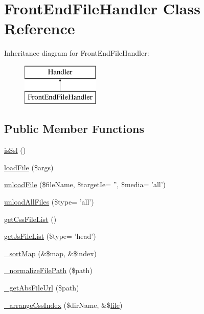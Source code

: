 \hypertarget{classFrontEndFileHandler}{\section{Front\+End\+File\+Handler Class Reference}
\label{classFrontEndFileHandler}
}
Inheritance diagram for Front\+End\+File\+Handler\+:\begin{figure}[H]
\begin{center}
\leavevmode
\includegraphics[height=2.000000cm]{classFrontEndFileHandler}
\end{center}
\end{figure}
\subsection*{Public Member Functions}
\begin{DoxyCompactItemize}
\item 
\hyperlink{classFrontEndFileHandler_a2bd70c621572f784c4e563d0dafa0fc2}{is\+Ssl} ()
\item 
\hyperlink{classFrontEndFileHandler_aeb802ae7b7b315da73ec3be224ce9e9f}{load\+File} (\$args)
\item 
\hyperlink{classFrontEndFileHandler_ad55bc752b0d140bbfefaaa30057db3d2}{unload\+File} (\$file\+Name, \$target\+Ie= '', \$media= 'all')
\item 
\hyperlink{classFrontEndFileHandler_ad118128391da5bb33e4a7105152432bc}{unload\+All\+Files} (\$type= 'all')
\item 
\hyperlink{classFrontEndFileHandler_a35cff5fb32625790d01e8839c73fd0fc}{get\+Css\+File\+List} ()
\item 
\hyperlink{classFrontEndFileHandler_ab6147b1dac393bc3838d433f3c46553f}{get\+Js\+File\+List} (\$type= 'head')
\item 
\hyperlink{classFrontEndFileHandler_a3677abdd2a1a3a17fd1de9f58ffe27a5}{\+\_\+sort\+Map} (\&\$map, \&\$index)
\item 
\hyperlink{classFrontEndFileHandler_a4818293d9395dd1b4d62b8cabeb04603}{\+\_\+normalize\+File\+Path} (\$path)
\item 
\hyperlink{classFrontEndFileHandler_a0a76e82d6037ea9a862e1585b2e562df}{\+\_\+get\+Abs\+File\+Url} (\$path)
\item 
\hyperlink{classFrontEndFileHandler_aedfe6ba984a8e33de211ef23e83cd98e}{\+\_\+arrange\+Css\+Index} (\$dir\+Name, \&\$\hyperlink{classfile}{file})
\end{DoxyCompactItemize}
